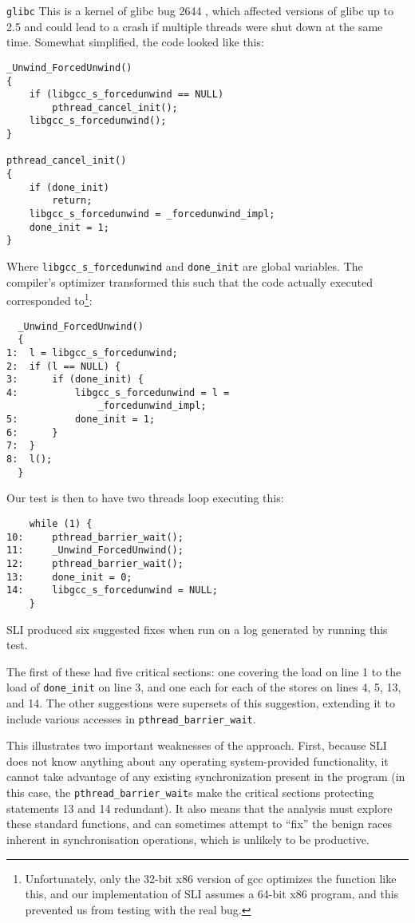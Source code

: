 \documentclass[10pt,twocolumn,preprint,natbib,authoryear]{sigplanconf}
\begin{document}
\verb|glibc| This is a kernel of glibc bug 2644 \cite{glibc2644},
which affected versions of glibc up to 2.5 and could lead to a crash
if multiple threads were shut down at the same time.  Somewhat
simplified, the code looked like this:

\begin{verbatim}
_Unwind_ForcedUnwind()
{
    if (libgcc_s_forcedunwind == NULL)
        pthread_cancel_init();
    libgcc_s_forcedunwind();
}

pthread_cancel_init()
{
    if (done_init)
        return;
    libgcc_s_forcedunwind = _forcedunwind_impl;
    done_init = 1;
}
\end{verbatim}

Where \verb|libgcc_s_forcedunwind| and \verb|done_init| are global
variables.  The compiler's optimizer transformed this such that the
code actually executed corresponded to\footnote{Unfortunately, only
  the 32-bit x86 version of gcc optimizes the function like this, and
  our implementation of SLI assumes a 64-bit x86 program, and this
  prevented us from testing with the real bug.}:

\begin{verbatim}
  _Unwind_ForcedUnwind()
  {
1:  l = libgcc_s_forcedunwind;
2:  if (l == NULL) {
3:      if (done_init) {
4:          libgcc_s_forcedunwind = l =
                _forcedunwind_impl;
5:          done_init = 1;
6:      }
7:  }
8:  l();
  }
\end{verbatim}

Our test is then to have two threads loop executing this:

\begin{verbatim}
    while (1) {
10:     pthread_barrier_wait();
11:     _Unwind_ForcedUnwind();
12:     pthread_barrier_wait();
13:     done_init = 0;
14:     libgcc_s_forcedunwind = NULL;
    }
\end{verbatim}

SLI produced six suggested fixes when run on a log generated by
running this test.

The first of these had five critical sections: one covering the load
on line 1 to the load of \verb|done_init| on line 3, and one each for
each of the stores on lines 4, 5, 13, and 14.  The other suggestions
were supersets of this suggestion, extending it to include various
accesses in \verb|pthread_barrier_wait|.

This illustrates two important weaknesses of the approach.  First,
because SLI does not know anything about any operating system-provided
functionality, it cannot take advantage of any existing
synchronization present in the program (in this case, the
\verb|pthread_barrier_wait|s make the critical sections protecting
statements 13 and 14 redundant).  It also means that the analysis must
explore these standard functions, and can sometimes attempt to ``fix''
the benign races inherent in synchronisation operations, which is
unlikely to be productive.
\end{document}
